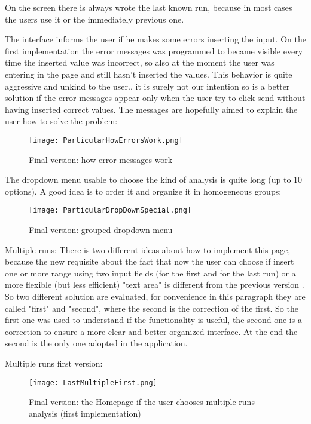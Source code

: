 On the screen there is always wrote the last known run, because in most cases the users use it or the immediately previous one. 

The interface informs the user if he makes some errors inserting the input. On the first implementation the error messages was programmed to became visible every time the inserted value was incorrect, so also at the moment the user was entering in the page and still hasn't inserted the values. This behavior is quite aggressive and unkind to the user.. it is surely not our intention so is a better solution if the error messages appear only when the user try to click send without having inserted correct values. The messages are hopefully aimed to explain the user how to solve the problem:

\begin{figure}[H]
\centering
\texttt{[image: ParticularHowErrorsWork.png]} 
\caption{Final version: how error messages work}
\end{figure}    


\newpage
The dropdown menu usable to choose the kind of analysis is quite long (up to 10 options). A good idea is to order it and organize it in homogeneous groups:

\begin{figure}[H]
\centering
\texttt{[image: ParticularDropDownSpecial.png]} 
\caption{Final version: grouped dropdown menu}
\end{figure}    

  
Multiple runs:  
There is two different ideas about how to implement this page, because the new requisite about the fact that now the user can choose if insert one or more range using two input fields (for the first and for the last run) or a more flexible (but less efficient) "text area" is different from the previous version . So two different solution are evaluated, for convenience in this paragraph they are called "first" and "second", where the second is the correction of the first. So the first one was used to understand if the functionality is useful, the second one is a correction to ensure a more clear and better organized interface. At the end the second is the only one adopted in the application.

\newpage

Multiple runs first version:
\begin{figure}[H]
\centering
\texttt{[image: LastMultipleFirst.png]} 
\caption{Final version: the Homepage if the user chooses multiple runs analysis (first implementation)}
\end{figure}    

